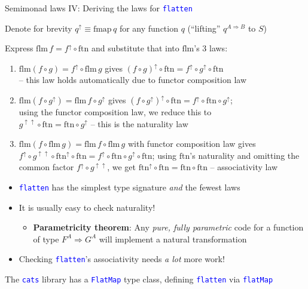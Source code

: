 \documentclass[english]{beamer}
\begin{document}
\begin{frame}{Semimonad laws IV: Deriving the laws for \texttt{\textcolor{blue}{\footnotesize{}flatten}} }

Denote for brevity $q^{\uparrow}\equiv\text{fmap}\,q$ for any function
$q$ (``lifting'' $q^{A\Rightarrow B}$ to $S$)

Express $\text{flm}\,f=f^{\uparrow}\circ\text{ftn}$ and substitute
that into $\text{flm}$'s 3 laws:
\begin{enumerate}
\item {\footnotesize{}$\text{flm}\left(f\circ g\right)=f^{\uparrow}\circ\text{flm}\,g$}
gives {\footnotesize{}$\left(f\circ g\right)^{\uparrow}\circ\text{ftn}=f^{\uparrow}\circ g^{\uparrow}\circ\text{ftn}$}\\
-- this law holds automatically due to functor composition law
\item {\footnotesize{}$\text{flm}\left(f\circ g^{\uparrow}\right)=\text{flm}\,f\circ g^{\uparrow}$}
gives {\footnotesize{}$\left(f\circ g^{\uparrow}\right)^{\uparrow}\circ\text{ftn}=f^{\uparrow}\circ\text{ftn}\circ g^{\uparrow}$};\\
using the functor composition law, we reduce this to\\
{\footnotesize{}$g^{\uparrow\uparrow}\circ\text{ftn}=\text{ftn}\circ g^{\uparrow}$}
-- this is the naturality law
\item {\footnotesize{}$\text{flm}\left(f\circ\text{flm}\,g\right)=\text{flm}\,f\circ\text{flm}\,g$
}with functor composition law gives{\footnotesize{} $f^{\uparrow}\circ g^{\uparrow\uparrow}\circ\text{ftn}^{\uparrow}\circ\text{ftn}=f^{\uparrow}\circ\text{ftn}\circ g^{\uparrow}\circ\text{ftn}$;}
using {\footnotesize{}$\text{ftn}$}'s naturality and omitting the
common factor{\footnotesize{} $f^{\uparrow}\circ g^{\uparrow\uparrow}$},
we get{\footnotesize{} $\text{ftn}^{\uparrow}\circ\text{ftn}=\text{ftn}\circ\text{ftn}$}
-- associativity law
\end{enumerate}
\begin{itemize}
\item \texttt{\textcolor{blue}{\footnotesize{}flatten}} has the simplest
type signature \emph{and} the fewest laws
\item It is usually easy to check naturality!
\begin{itemize}
\item \textbf{Parametricity theorem}: Any \emph{pure, fully parametric}
code for a function of type $F^{A}\Rightarrow G^{A}$ will implement
a natural transformation
\end{itemize}
\item Checking \texttt{\textcolor{blue}{\footnotesize{}flatten}}'s associativity
needs \emph{a lot} more work!
\end{itemize}
The \texttt{\textcolor{blue}{\footnotesize{}cats}} library has a \texttt{\textcolor{blue}{\footnotesize{}FlatMap}}
type class, defining \texttt{\textcolor{blue}{\footnotesize{}flatten}}
via \texttt{\textcolor{blue}{\footnotesize{}flatMap}} 
\end{frame}
\end{document}
